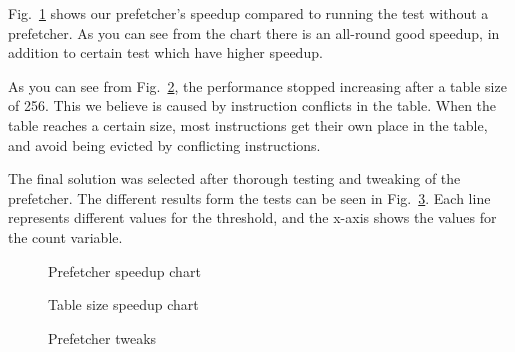 Fig.~\ref{fig:prefetcher_speedup} shows our prefetcher's speedup compared to running the test without a prefetcher. As you can see from the chart there is an all-round good speedup, in addition to certain test which have higher speedup.

As you can see from Fig.~\ref{fig:table_size_chart}, the performance stopped increasing after a table size of 256. This we believe is caused by instruction conflicts in the table. When the table reaches a certain size, most instructions get their own place in the table, and avoid being evicted by conflicting instructions.

The final solution was selected after thorough testing and tweaking of the prefetcher. The different results form the tests can be seen in Fig.~\ref{fig:prefetcher_tweaks}. Each line represents different values for the threshold, and the x-axis shows the values for the count variable.

\begin{figure}
	
	\caption{Prefetcher speedup chart}
	\label{fig:prefetcher_speedup}
\end{figure}

\begin{figure}
	
	\caption{Table size speedup chart}
	\label{fig:table_size_chart}
\end{figure}

\begin{figure}
	
	\caption{Prefetcher tweaks}
	\label{fig:prefetcher_tweaks}
\end{figure}
